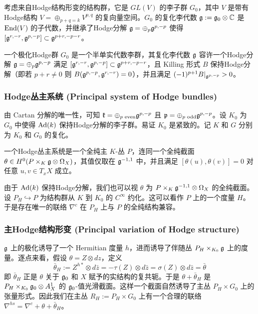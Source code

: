 考虑来自Hodge结构形变的结构群，它是 $GL(V)$ 的李子群 $G_0$，其中 $V$ 是带有Hodge结构 $V = \oplus_{p+q=k} V^{p,q}$ 的复向量空间。$G_0$ 的复化李代数 $\mathfrak{g} := \mathfrak{g}_0 \otimes \mathbb{C}$ 是 $\operatorname{End}(V)$ 的子代数，并继承了Hodge分解 $\mathfrak{g} = \oplus_p \mathfrak{g}^{p, -p}$ 使得 $[\mathfrak{g}^{r, -r}, \mathfrak{g}^{p, -p}] \subset \mathfrak{g}^{p+r, -p-r}$。

\begin{definition}[极化Hodge群]
一个极化Hodge群 $G_0$ 是一个半单实代数李群，其复化李代数 $\mathfrak{g}$ 容许一个Hodge分解 $\mathfrak{g} = \oplus_p \mathfrak{g}^{p, -p}$ 满足 $[\mathfrak{g}^{r, -r}, \mathfrak{g}^{p, -p}] \subset \mathfrak{g}^{p+r, -p-r}$，且 Killing 形式 $B$ 保持Hodge分解（即若 $p+r \neq 0$ 则 $B(\mathfrak{g}^{p, -p}, \mathfrak{g}^{r, -r}) = 0$），并且满足 $(-1)^{p+1} B|_{\mathfrak{g}^{p, -p}} > 0$。
\end{definition}

\subsubsection*{Hodge丛主系统 (Principal system of Hodge bundles)}

由 Cartan 分解的唯一性，可知 $\mathfrak{k} = \oplus_{p \text{ even}} \mathfrak{g}^{p, -p}$ 且 $\mathfrak{p} = \oplus_{p \text{ odd}} \mathfrak{g}^{p, -p}$。设 $K_0$ 为 $G_0$ 中使得 $\operatorname{Ad}(k)$ 保持Hodge分解的李子群。易证 $K_0$ 是紧致的。记 $K$ 和 $G$ 分别为 $K_0$ 和 $G_0$ 的复化。

\begin{definition}
一个Hodge丛主系统是一个全纯主 $K$-丛 $P$，连同一个全纯截面 $\theta \in H^0(P \times_K \mathfrak{g} \otimes \Omega_X)$，其值仅取在 $\mathfrak{g}^{-1, 1}$ 中，并且满足 $[\theta(u), \theta(v)] = 0$ 对任意 $u, v \in T_xX$ 成立。
\end{definition}

由于 $\operatorname{Ad}(k)$ 保持Hodge分解，我们也可以视 $\theta$ 为 $P \times_K \mathfrak{g}^{-1, 1} \otimes \Omega_X$ 的全纯截面。
设 $P_H \hookrightarrow P$ 为结构群从 $K$ 到 $K_0$ 的 $C^\infty$ 约化。这可以看作 $P$ 上的一个度量 $H$。于是存在唯一的联络 $\nabla^c$ 在 $P_H$ 上与 $P$ 的全纯结构兼容。

\subsubsection*{主Hodge结构形变 (Principal variation of Hodge structure)}

$\mathfrak{g}$ 上的极化诱导了一个 Hermitian 度量 $h$，进而诱导了伴随丛 $P_H \times_{K_0} \mathfrak{g}$ 上的度量。逐点来看，假设 $\theta = Z \otimes dz$，定义
\[ \bar{\theta}_H := Z^{h*} \otimes d\bar{z} = -\tau(Z) \otimes d\bar{z} = \sigma(Z) \otimes d\bar{z} = \bar{\theta} \]
即 $\bar{\theta}_H$ 正是 $\theta$ 关于 $\mathfrak{g}_0$ 和 $X$ 赋予的实结构的复共轭。于是 $\theta + \bar{\theta}_H$ 是 $P_H \times_{K_0} \mathfrak{g}_0 \otimes A_X^1$ 的 $\mathfrak{g}_0$-值光滑截面。这样一个截面自然诱导了主丛 $P_H \times G_0$ 上的张量形式。因此我们在主丛 $R_H := P_H \times G_0$ 上有一个合理的联络 $\nabla^{hs} = \nabla^c + \theta + \bar{\theta}_H$。

